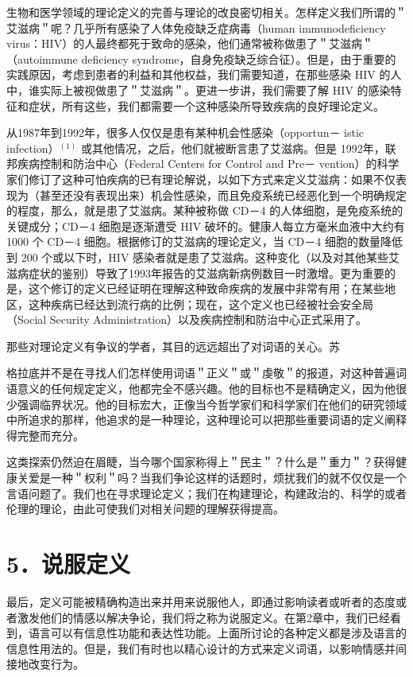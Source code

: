 生物和医学领域的理论定义的完善与理论的改良密切相关。怎样定义我们所谓的＂艾滋病＂呢？几乎所有感染了人体免疫缺乏症病毒（human immunodeficiency virus：HIV）的人最终都死于致命的感染，他们通常被称做患了＂艾滋病＂（autoimmune deficiency syndrome，自身免疫缺乏综合征）。但是，由于重要的实践原因，考虑到患者的利益和其他权益，我们需要知道，在那些感染 HIV 的人中，谁实际上被视做患了＂艾滋病＂。更进一步讲，我们需要了解 HIV 的感染特征和症状，所有这些，我们都需要一个这种感染所导致疾病的良好理论定义。

从1987年到1992年，很多人仅仅是患有某种机会性感染（opportun－ istic infection）${ }^{(1)}$ 或其他情况，之后，他们就被断言患了艾滋病。但是 1992年，联邦疾病控制和防治中心（Federal Centers for Control and Pre－ vention）的科学家们修订了这种可怕疾病的已有理论解说，以如下方式来定义艾滋病：如果不仅表现为（甚至还没有表现出来）机会性感染，而且免疫系统已经恶化到一个明确规定的程度，那么，就是患了艾滋病。某种被称做 CD－4 的人体细胞，是免疫系统的关键成分；CD－4 细胞是逐渐遭受 HIV 破坏的。健康人每立方毫米血液中大约有 1000 个 CD－4 细胞。根据修订的艾滋病的理论定义，当 CD－4 细胞的数量降低到 200 个或以下时，HIV 感染者就是患了艾滋病。这种变化（以及对其他某些艾滋病症状的鉴别）导致了1993年报告的艾滋病新病例数目一时激增。更为重要的是，这个修订的定义已经证明在理解这种致命疾病的发展中非常有用；在某些地区，这种疾病已经达到流行病的比例；现在，这个定义也已经被社会安全局（Social Security Administration）以及疾病控制和防治中心正式采用了。

那些对理论定义有争议的学者，其目的远远超出了对词语的关心。苏

格拉底并不是在寻找人们怎样使用词语＂正义＂或＂虔敬＂的报道，对这种普遍词语意义的任何规定定义，他都完全不感兴趣。他的目标也不是精确定义，因为他很少强调临界状况。他的目标宏大，正像当今哲学家们和科学家们在他们的研究领域中所追求的那样，他追求的是一种理论，这种理论可以把那些重要词语的定义阐释得完整而充分。

这类探索仍然迫在眉睫，当今哪个国家称得上＂民主＂？什么是＂重力＂？获得健康关爱是一种＂权利＂吗？当我们争论这样的话题时，烦扰我们的就不仅仅是一个言语问题了。我们也在寻求理论定义；我们在构建理论，构建政治的、科学的或者伦理的理论，由此可使我们对相关问题的理解获得提高。

\section*{5．说服定义}
最后，定义可能被精确构造出来并用来说服他人，即通过影响读者或听者的态度或者激发他们的情感以解决争论，我们将之称为说服定义。在第2章中，我们已经看到，语言可以有信息性功能和表达性功能。上面所讨论的各种定义都是涉及语言的信息性用法的。但是，我们有时也以精心设计的方式来定义词语，以影响情感并间接地改变行为。

